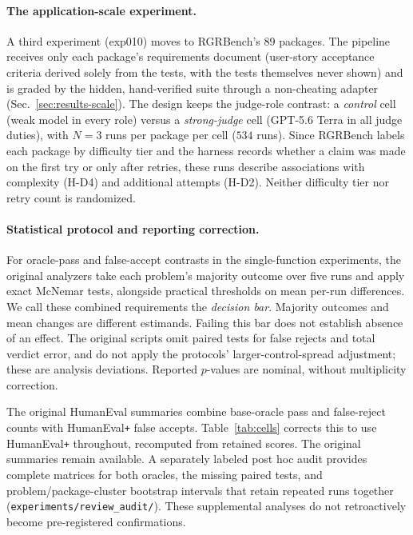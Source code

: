 \paragraph{The application-scale experiment.} A third experiment (exp010) moves to
RGRBench's $89$ packages. The pipeline receives only each package's requirements document
(user-story acceptance criteria derived solely from the tests, with the tests themselves never
shown) and is graded by the hidden, hand-verified suite through a non-cheating adapter
(Sec.~\ref{sec:results-scale}). The design keeps the judge-role contrast: a \emph{control} cell (weak model in every role) versus a \emph{strong-judge}
cell (GPT-5.6 Terra in all judge duties), with $N{=}3$ runs per package per cell ($534$ runs). Since
RGRBench labels each package by difficulty tier and the harness records whether a claim was made on
the first try or only after retries, these runs describe associations with complexity (H-D4) and additional attempts (H-D2).
Neither difficulty tier nor retry count is randomized.

\paragraph{Statistical protocol and reporting correction.} For oracle-pass and false-accept
contrasts in the single-function experiments, the original analyzers take each problem's
majority outcome over five runs and apply exact McNemar tests, alongside practical thresholds
on mean per-run differences. We call these combined requirements the \emph{decision bar}.
Majority outcomes and mean changes are different estimands. Failing this bar does not establish
absence of an effect. The original scripts omit paired tests for false rejects and total
verdict error, and do not apply the protocols' larger-control-spread adjustment; these are
analysis deviations. Reported $p$-values are nominal, without multiplicity correction.

The original HumanEval summaries combine base-oracle pass and false-reject counts with
HumanEval\texttt{+} false accepts. Table~\ref{tab:cells} corrects this to use
HumanEval\texttt{+} throughout, recomputed from retained scores. The original summaries
remain available. A separately labeled post hoc audit provides complete matrices for both
oracles, the missing paired tests, and problem/package-cluster bootstrap intervals that
retain repeated runs together (\texttt{experiments/review\_audit/}). These supplemental
analyses do not retroactively become pre-registered confirmations.

